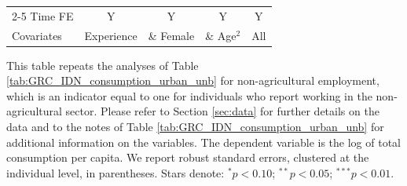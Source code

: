 \begin{table}[htbp]
\begin{threeparttable}
\begin{tabular}{l cccc}
\cmidrule{2-5} Time FE & Y & Y & Y & Y \\ Covariates & Experience & \& Female & \& Age$^2$ & All \\ \bottomrule \end{tabular} \begin{tablenotes}[flushleft] \footnotesize \item{This table repeats the analyses of Table \ref{tab:GRC_IDN_consumption_urban_unb}  for non-agricultural employment, which is an indicator equal to one for individuals who report working in the non-agricultural sector. Please refer to Section \ref{sec:data} for further details on the data and to the notes of Table \ref{tab:GRC_IDN_consumption_urban_unb} for additional information on the variables. The dependent variable is the log of total consumption per capita. We report robust standard errors, clustered at the individual level, in parentheses. Stars denote: $^{*} p<0.10$; $^{**} p<0.05$; $^{***} p<0.01$.} \end{tablenotes} \end{threeparttable} \end{table}
